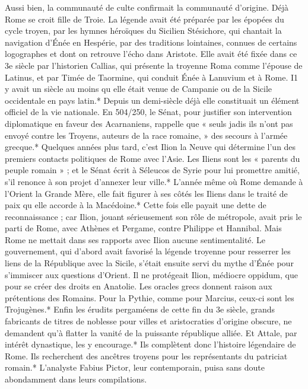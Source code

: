\documentclass[a4paper, 11pt, oneside, polutonikogreek, french]{article}
\begin{document}
Aussi bien, la communauté de culte confirmait la communauté d'origine. Déjà Rome se croit fille de Troie. La légende avait été préparée par les épopées du cycle troyen, par les hymnes héroïques du Sicilien Stésichore, qui chantait la navigation d'Énée en Hespérie, par des traditions lointaines, connues de certains logographes et dont on retrouve l'écho dans Aristote. Elle avait été fixée dans ce 3e siècle par l'historien Callias, qui présente la troyenne Roma comme l'épouse de Latinus, et par Timée de Taormine, qui conduit Énée à Lanuvium et à Rome. I1 y avait un siècle au moins qu elle était venue de Campanie ou de la Sicile occidentale en pays latin.* Depuis un demi-siècle déjà elle constituait un élément officiel de la vie nationale. En 504/250, le Sénat, pour justifier son intervention diplomatique en faveur des Acarnaniens, rappelle que « seuls jadis ils n'ont pas envoyé contre les Troyens, auteurs de la race romaine, » des secours à l'armée grecque.* Quelques années plus tard, c'est Ilion la Neuve qui détermine l'un des premiers contacts politiques de Rome avec l'Asie. Les Iliens sont les « parents du peuple romain » ; et le Sénat écrit à Séleucos de Syrie pour lui promettre amitié, s'il renonce à son projet d'annexer leur ville.* L'année même où Rome demande à l'Orient la Grande Mère, elle fait figurer à ses côtés les Iliens dans le traité de paix qu elle accorde à la Macédoine.* Cette fois elle payait une dette de reconnaissance ; car Ilion, jouant sérieusement son rôle de métropole, avait pris le parti de Rome, avec Athènes et Pergame, contre Philippe et Hannibal. Mais Rome ne mettait dans ses rapports avec Ilion aucune sentimentalité. Le gouvernement, qui d'abord avait favorisé la légende troyenne pour resserrer les liens de la République avec la Sicile, s'était ensuite servi du mythe d'Énée pour s'immiscer aux questions d'Orient. Il ne protégeait Ilion, médiocre oppidum, que pour se créer des droits en Anatolie. Les oracles grecs donnent raison aux prétentions des Romains. Pour la Pythie, comme pour Marcius, ceux-ci sont les Trojugènes.* Enfin les érudits pergaméens de cette fin du 3e siècle, grands fabricants de titres de noblesse pour villes et aristocraties d'origine obscure, ne demandent qu'à flatter la vanité de la puissante république alliée. Et Attale, par intérêt dynastique, les y encourage.* Ils complètent donc l'histoire légendaire de Rome. Ils recherchent des ancêtres troyens pour les représentants du patriciat romain.* L'analyste Fabius Pictor, leur contemporain, puisa sans doute abondamment dans leurs compilations.
\end{document}
